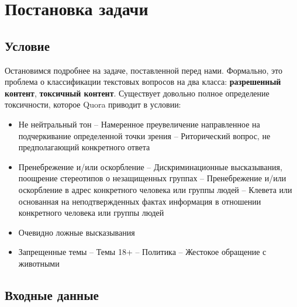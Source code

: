 \section{Постановка задачи}


\subsection{Условие}
Остановимся подробнее на задаче, поставленной перед нами. Формально, это проблема о классификации текстовых вопросов на два класса: \textbf{разрешенный контент}, \textbf{токсичный контент}. Существует довольно полное определение токсичности, которое Quora приводит в условии:

\begin{itemize}
\item
Не нейтральный тон
\subitem
    -- Намеренное преувеличение направленное на подчеркивание определенной точки зрения
\subitem
    -- Риторический вопрос, не предполагающий конкретного ответа
\item Пренебрежение и/или оскорбление
\subitem
    -- Дискриминационные высказывания, поощрение стереотипов о незащищенных группах
\subitem
    -- Пренебрежение и/или оскорбление в адрес конкретного человека или группы людей
\subitem
    -- Клевета или основанная на неподтвержденных фактах информация в отношении конкретного человека или группы людей
\item Очевидно ложные высказывания
\item Запрещенные темы
\subitem
    -- Темы 18+
\subitem
    -- Политика
\subitem
    -- Жестокое обращение с животными

\end{itemize}

\pagebreak

\subsection{Входные данные}

